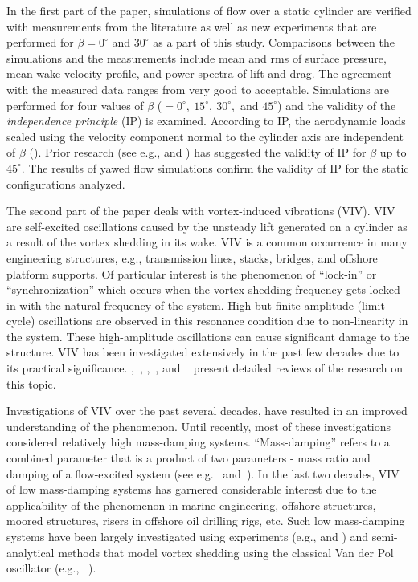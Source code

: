 In the first part of the paper, simulations of flow over a static cylinder are
verified with measurements from the literature as well as new experiments that
are performed for $\beta=0^\circ$ and $30^\circ$ as a part of this study.
Comparisons between the simulations and the measurements include mean and rms
of surface pressure, mean wake velocity profile, and power spectra of lift and
drag. The agreement with the measured data ranges from very good to acceptable.
Simulations are performed for four values of $\beta$
($=0^\circ,~15^\circ,~30^\circ,$ and $45^\circ$) and the validity of the {\em
independence principle} (IP) is examined. According to IP, the aerodynamic
loads scaled using the velocity component normal to the cylinder axis are
independent of $\beta$ (\citet{zdravkovich2003flow}). Prior research (see e.g.,
\citet{franzini2009experimental} and \citet{zhao2009direct}) has suggested the
validity of IP for $\beta$ up to $45^\circ$. The results of yawed flow
simulations confirm the validity of IP for the static configurations analyzed.

The second part of the paper deals with vortex-induced vibrations (VIV). VIV
are self-excited oscillations caused by the unsteady lift generated on a
cylinder as a result of the vortex shedding in its wake. VIV is a common
occurrence in many engineering structures, e.g., transmission lines, stacks,
bridges, and offshore platform supports. Of particular interest is the
phenomenon of ``lock-in'' or ``synchronization'' which occurs when the
vortex-shedding frequency gets locked in with the natural frequency of the
system. High but finite-amplitude (limit-cycle) oscillations are observed in
this resonance condition due to non-linearity in the system. These
high-amplitude oscillations can cause significant damage to the structure. VIV
has been investigated extensively in the past few decades due to its practical
significance. \cite{bearman1984vortex},~\cite{sarpkaya2004critical},
\cite{williamson2004vortex},~\cite{paidoussis2010fluid}, and
~\cite{naudascher2012flow} present detailed reviews of the research on this
topic.

Investigations of VIV over the past several decades, have resulted in an
improved understanding of the phenomenon. Until recently, most of these
investigations considered relatively high mass-damping systems.
``Mass-damping'' refers to a combined parameter that is a product of two
parameters - mass ratio and damping of a flow-excited system (see
e.g.~\cite{scruton1955wind} and~\cite{vandiver2012damping}). In the last two
decades, VIV of low mass-damping systems has garnered considerable interest due
to the applicability of the phenomenon in marine engineering, offshore
structures, moored structures, risers in offshore oil drilling rigs, etc. Such
low mass-damping systems have been largely investigated using experiments
(e.g., \citet{jain2013vortex} and \citet{franzini2013one}) and semi-analytical
methods that model vortex shedding using the classical Van der Pol oscillator
(e.g., ~\cite{xu2008high}). 

